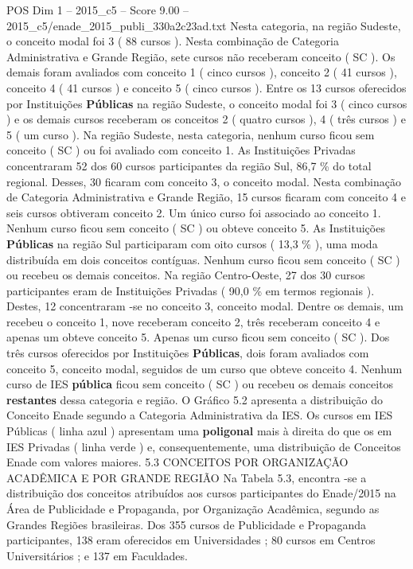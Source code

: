 \begin{textsample}{POS Dim 1 – 2015\_c5 – Score 9.00 – 2015\_c5/enade\_2015\_publi\_330a2c23ad.txt}
Nesta categoria, na região Sudeste, o conceito modal foi 3 ( 88 cursos ).
Nesta combinação de Categoria Administrativa e Grande Região, sete cursos não receberam conceito ( SC ).
Os demais foram avaliados com conceito 1 ( cinco cursos ), conceito 2 ( 41 cursos ), conceito 4 ( 41 cursos ) e conceito 5 ( cinco cursos ).
Entre os 13 cursos oferecidos por Instituições \textbf{Públicas} na região Sudeste, o conceito modal foi 3 ( cinco cursos ) e os demais cursos receberam os conceitos 2 ( quatro cursos ), 4 ( três cursos ) e 5 ( um curso ).
Na região Sudeste, nesta categoria, nenhum curso ficou sem conceito ( SC ) ou foi avaliado com conceito 1.
As Instituições Privadas concentraram 52 dos 60 cursos participantes da região Sul, 86,7 \% do total regional.
Desses, 30 ficaram com conceito 3, o conceito modal.
Nesta combinação de Categoria Administrativa e Grande Região, 15 cursos ficaram com conceito 4 e seis cursos obtiveram conceito 2.
Um único curso foi associado ao conceito 1.
Nenhum curso ficou sem conceito ( SC ) ou obteve conceito 5.
As Instituições \textbf{Públicas} na região Sul participaram com oito cursos ( 13,3 \% ), uma moda distribuída em dois conceitos contíguas.
Nenhum curso ficou sem conceito ( SC ) ou recebeu os demais conceitos.
Na região Centro-Oeste, 27 dos 30 cursos participantes eram de Instituições Privadas ( 90,0 \% em termos regionais ).
Destes, 12 concentraram -se no conceito 3, conceito modal.
Dentre os demais, um recebeu o conceito 1, nove receberam conceito 2, três receberam conceito 4 e apenas um obteve conceito 5.
Apenas um curso ficou sem conceito ( SC ).
Dos três cursos oferecidos por Instituições \textbf{Públicas}, dois foram avaliados com conceito 5, conceito modal, seguidos de um curso que obteve conceito 4.
Nenhum curso de IES \textbf{pública} ficou sem conceito ( SC ) ou recebeu os demais conceitos \textbf{restantes} dessa categoria e região.
O Gráfico 5.2 apresenta a distribuição do Conceito Enade segundo a Categoria Administrativa da IES.
Os cursos em IES Públicas ( linha azul ) apresentam uma \textbf{poligonal} mais à direita do que os em IES Privadas ( linha verde ) e, consequentemente, uma distribuição de Conceitos Enade com valores maiores. 5.3 CONCEITOS POR ORGANIZAÇÃO ACADÊMICA E POR GRANDE REGIÃO Na Tabela 5.3, encontra -se a distribuição dos conceitos atribuídos aos cursos participantes do Enade/2015 na Área de Publicidade e Propaganda, por Organização Acadêmica, segundo as Grandes Regiões brasileiras.
Dos 355 cursos de Publicidade e Propaganda participantes, 138 eram oferecidos em Universidades ; 80 cursos em Centros Universitários ; e 137 em Faculdades.

\end{textsample}

